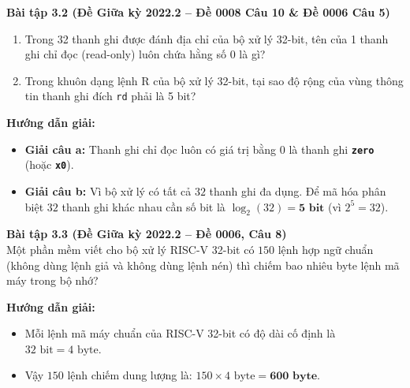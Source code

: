 \textbf{Bài tập 3.2 (Đề Giữa kỳ 2022.2 -- Đề 0008 Câu 10 \& Đề 0006 Câu 5)}
\begin{enumerate}[label=\alph*)]
    \item Trong 32 thanh ghi được đánh địa chỉ của bộ xử lý 32-bit, tên của 1 thanh ghi chỉ đọc (read-only) luôn chứa hằng số 0 là gì?
    \item Trong khuôn dạng lệnh R của bộ xử lý 32-bit, tại sao độ rộng của vùng thông tin thanh ghi đích \texttt{rd} phải là 5 bit?
\end{enumerate}
\textbf{Hướng dẫn giải:}
\begin{itemize}
    \item \textbf{Giải câu a:} Thanh ghi chỉ đọc luôn có giá trị bằng 0 là thanh ghi \textbf{\texttt{zero}} (hoặc \textbf{\texttt{x0}}).
    \item \textbf{Giải câu b:} Vì bộ xử lý có tất cả $32$ thanh ghi đa dụng. Để mã hóa phân biệt $32$ thanh ghi khác nhau cần số bit là $\log_2(32) = \mathbf{5\text{ bit}}$ (vì $2^5 = 32$).
\end{itemize}

\textbf{Bài tập 3.3 (Đề Giữa kỳ 2022.2 -- Đề 0006, Câu 8)}\\
Một phần mềm viết cho bộ xử lý RISC-V 32-bit có $150$ lệnh hợp ngữ chuẩn (không dùng lệnh giả và không dùng lệnh nén) thì chiếm bao nhiêu byte lệnh mã máy trong bộ nhớ?

\textbf{Hướng dẫn giải:}
\begin{itemize}
    \item Mỗi lệnh mã máy chuẩn của RISC-V 32-bit có độ dài cố định là $32\text{ bit} = 4\text{ byte}$.
    \item Vậy $150$ lệnh chiếm dung lượng là: $150 \times 4\text{ byte} = \mathbf{600\text{ byte}}$.
\end{itemize}

